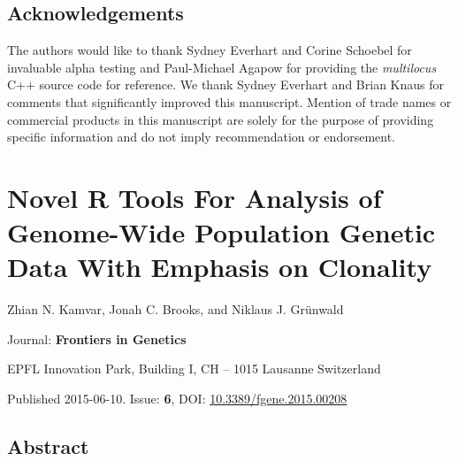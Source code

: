 \documentclass[double,12pt]{beavtex}
\begin{document}
  \section{Acknowledgements}\label{acknowledgements}
  
  The authors would like to thank Sydney Everhart and Corine Schoebel for
  invaluable alpha testing and Paul-Michael Agapow for providing the
  \emph{multilocus} C++ source code for reference. We thank Sydney
  Everhart and Brian Knaus for comments that significantly improved this
  manuscript. Mention of trade names or commercial products in this
  manuscript are solely for the purpose of providing specific information
  and do not imply recommendation or endorsement.
  
  \chapter{Novel R Tools For Analysis of Genome-Wide Population Genetic
  Data With Emphasis on
  Clonality}\label{novel-r-tools-for-analysis-of-genome-wide-population-genetic-data-with-emphasis-on-clonality}
  
  \singlespacing
  
  \begin{center}
  
  Zhian N. Kamvar, Jonah C. Brooks, and Niklaus J. Grünwald
  
  
  
  \end{center}\vspace*{\fill}
  
  Journal: \textbf{Frontiers in Genetics}
  
  EPFL Innovation Park, Building I, CH -- 1015 Lausanne Switzerland
  
  Published 2015-06-10. Issue: \textbf{6}, DOI:
  \href{http://dx.doi.org/10.3389/fgene.2015.00208}{10.3389/fgene.2015.00208}
  
  \doublespacing
  \newpage
  
  \section{Abstract}\label{abstract-1}
  
\end{document}
